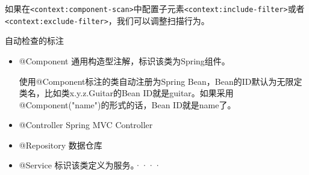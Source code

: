 

如果在\lstinline$<context:component-scan>$中配置子元素\lstinline$<context:include-filter>$或者\lstinline$<context:exclude-filter>$，我们可以调整扫描行为。




自动检查的标注
\begin{itemize}
\item @Component 通用构造型注解，标识该类为Spring组件。

使用@Component标注的类自动注册为Spring Bean，Bean的ID默认为无限定类名，比如类x.y.z.Guitar的Bean ID就是guitar。如果采用@Component("name")的形式的话，Bean ID就是name了。


\item @Controller Spring MVC Controller

\item @Repository 数据仓库

\item @Service 标识该类定义为服务。····
\end{itemize}



